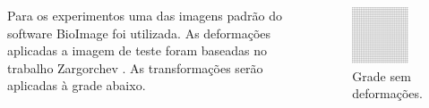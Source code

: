 \documentclass[t]{beamer}
\begin{document}
\begin{frame}
   \begin{columns}[c]
      Para os experimentos uma das imagens padrão do software BioImage \cite{papademetris2005bioimage} foi utilizada.
      As deformações aplicadas a imagem de teste foram baseadas no trabalho Zargorchev \cite{zagorchev2006comparative}.
        As transformações serão aplicadas à grade abaixo.
        \begin{figure}[!h]
          \begin{center}
            \includegraphics[width=0.8\textwidth]{figuras/grid.png}
            \caption{Grade sem deformações.}
          \end{center}
        \end{figure}
    \end{columns}
\end{frame}
\end{document}
